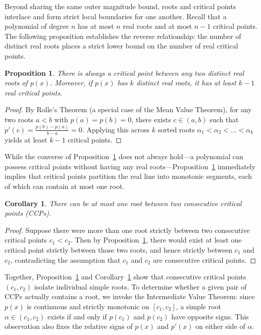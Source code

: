 \documentclass{amsart}
\newtheorem{proposition}{Proposition}
\newtheorem{corollary}{Corollary}
\begin{document}
Beyond sharing the same outer magnitude bound, roots and critical points interlace and form strict local boundaries for one another. Recall that a polynomial of degree $n$ has at most $n$ real roots and at most $n - 1$ critical points. The following proposition establishes the reverse relationship: the number of distinct real roots places a strict lower bound on the number of real critical points.

\begin{proposition}\label{prop_root}
    There is always a critical point between any two distinct real roots of $p(x)$. Moreover, if $p(x)$ has $k$ distinct real roots, it has at least $k-1$ real critical points.
\end{proposition}
\begin{proof}
    By Rolle's Theorem (a special case of the Mean Value Theorem), for any two roots $a < b$ with $p(a) = p(b) = 0$, there exists $c \in (a,b)$ such that $p'(c) = \frac{p(b)-p(a)}{b-a} = 0$. Applying this across $k$ sorted roots $\alpha_1 < \alpha_2 < \dots < \alpha_k$ yields at least $k-1$ critical points.
\end{proof}

While the converse of Proposition~\ref{prop_root} does not always hold—a polynomial can possess critical points without having any real roots—Proposition~\ref{prop_root} immediately implies that critical points partition the real line into monotonic segments, each of which can contain at most one root.

\begin{corollary}\label{cor_root}
    There can be at most one root between two consecutive critical points (CCPs).
\end{corollary}
\begin{proof}
    Suppose there were more than one root strictly between two consecutive critical points $c_1 < c_2$. Then by Proposition~\ref{prop_root}, there would exist at least one critical point strictly between those two roots, and hence strictly between $c_1$ and $c_2$, contradicting the assumption that $c_1$ and $c_2$ are consecutive critical points.
\end{proof}

Together, Proposition~\ref{prop_root} and Corollary~\ref{cor_root} show that consecutive critical points $(c_1, c_2)$ isolate individual simple roots. To determine whether a given pair of CCPs actually contains a root, we invoke the Intermediate Value Theorem: since $p(x)$ is continuous and strictly monotonic on $[c_1, c_2]$, a simple root $\alpha \in (c_1, c_2)$ exists if and only if $p(c_1)$ and $p(c_2)$ have opposite signs. This observation also fixes the relative signs of $p(x)$ and $p'(x)$ on either side of $\alpha$.
\end{document}
